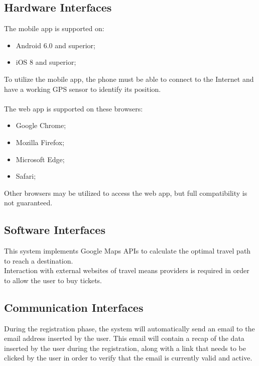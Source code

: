 \subsection{Hardware Interfaces}
\label{subsect:Hardware Interfaces}
	The mobile app is supported on:
	\begin{itemize}
		\item Android 6.0 and superior;
		\item iOS 8 and superior;
	\end{itemize}
	To utilize the mobile app, the phone must be able to connect to the Internet and have a working GPS sensor to identify its position. \\ \\
	The web app is supported on these browsers:
	\begin{itemize}
		\item Google Chrome;
		\item Mozilla Firefox;
		\item Microsoft Edge;
		\item Safari;
	\end{itemize}
	Other browsers may be utilized to access the web app, but full compatibility is not guaranteed.
\subsection{Software Interfaces}
\label{subsect:Software Interfaces}
	This system implements Google Maps APIs to calculate the optimal travel path to reach a destination. \\
	Interaction with external websites of travel means providers is required in order to allow the user to buy tickets.
\subsection{Communication Interfaces}
\label{subsect:Communication Interfaces}
	During the registration phase, the system will automatically send an email to the email address inserted by the user. This email will contain a recap of the data inserted by the user during the registration, along with a link that needs to be clicked by the user in order to verify that the email is currently valid and active.